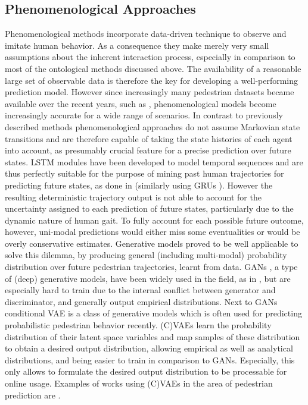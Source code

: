 \subsection{Phenomenological Approaches}
Phenomenological methods incorporate data-driven technique to observe and imitate human behavior. As a consequence they make merely very small assumptions about the inherent interaction process, especially in comparison to most of the ontological methods discussed above. The availability of a reasonable large set of observable data is therefore the key for developing a well-performing prediction model. However since increasingly many pedestrian datasets became available over the recent years, such as \cite{Pellegrini2009}\cite{Rasouli2019}\cite{Caesar2020}, phenomenological models become increasingly accurate for a wide range of scenarios. 
\newline
In contrast to previously described methods phenomenological approaches do not assume Markovian state transitions and are therefore capable of taking the state histories of each agent into account, as presumably crucial feature for a precise prediction over future states. \ac{LSTM} modules \cite{Hochreiter1997} have been developed to model temporal sequences and are thus perfectly suitable for the purpose of mining past human trajectories for predicting future states, as done in \cite{Chen2019a}\cite{Hug2018}\cite{Zhang2019}\cite{Jain2016} (similarly using GRUs \cite{Liu2020}). However the resulting deterministic trajectory output is not able to account for the uncertainty assigned to each prediction of future states, particularly due to the dynamic nature of human gait. To fully account for each possible future outcome, however, uni-modal predictions would either miss some eventualities or would be overly conservative estimates. 
\newline
Generative models proved to be well applicable to solve this dilemma, by producing general (including multi-modal) probability distribution over future pedestrian  trajectories, learnt from data. \ac{GAN}s \cite{Goodfellow2014}, a type of (deep) generative models, have been widely used in the field, as in \cite{Gupta2018}\cite{Kosaraju2019}\cite{Ouyang2018}, but are especially hard to train due to the internal conflict between generator and discriminator, and generally output empirical distributions. Next to \ac{GAN}s conditional \ac{VAE} is a class of generative models which is often used for predicting probabilistic pedestrian behavior recently. (C)\ac{VAE}s learn the probability distribution of their latent space variables and map samples of these distribution to obtain a desired output distribution, allowing empirical as well as analytical distributions, and being easier to train in comparison to \ac{GAN}s. Especially, this only allows to formulate the desired output distribution to be processable for online usage. Examples of works using (C)\ac{VAE}s in the area of pedestrian prediction are \cite{Ivanovic2018}\cite{Salzmann2020}\cite{Poibrenski2020}\cite{Lee2017}.

